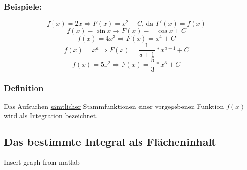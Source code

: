\documentclass[11pt]{amsart}
\theoremstyle{remark}
\begin{document}
\subsubsection*{Beispiele:}
\begin{equation}
	f(x)=2x \Rightarrow F(x) = x^2 + C \text{, da } F'(x) = f(x)
\end{equation}
\begin{equation}
	f(x)=\sin x  \Rightarrow F(x) = -\cos x + C 
\end{equation}
\begin{equation}
	f(x)=4x^3 \Rightarrow F(x) = x^4 + C 
\end{equation}
\begin{equation}
	f(x)=x^a \Rightarrow F(x) = \frac {1}{a+1}*x^{a+1}+C
\end{equation}
\begin{equation}
	f(x)=5x^2 \Rightarrow F(x) = \frac {5}{3}*x^{3}+C
\end{equation}
\subsubsection*{Definition}
Das Aufsuchen \underline{s\"amtlicher} Stammfunktionen einer vorgegebenen Funktion $f(x)$ wird als \underline{Integration} bezeichnet.
\subsection{Das bestimmte Integral als Fl\"acheninhalt}
Insert graph from matlab
\end{document}

